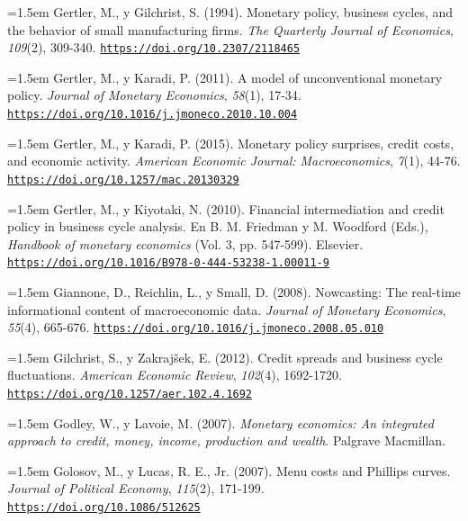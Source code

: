 \documentclass[10pt,a4paper]{article}
\begin{document}
\noindent\hangindent=1.5em Gertler, M., y Gilchrist, S. (1994). Monetary policy, business cycles, and the behavior of small manufacturing firms. \textit{The Quarterly Journal of Economics}, \textit{109}(2), 309-340. \href{https://doi.org/10.2307/2118465}{\nolinkurl{https://doi.org/10.2307/2118465}}

\noindent\hangindent=1.5em Gertler, M., y Karadi, P. (2011). A model of unconventional monetary policy. \textit{Journal of Monetary Economics}, \textit{58}(1), 17-34. \href{https://doi.org/10.1016/j.jmoneco.2010.10.004}{\nolinkurl{https://doi.org/10.1016/j.jmoneco.2010.10.004}}

\noindent\hangindent=1.5em Gertler, M., y Karadi, P. (2015). Monetary policy surprises, credit costs, and economic activity. \textit{American Economic Journal: Macroeconomics}, \textit{7}(1), 44-76. \href{https://doi.org/10.1257/mac.20130329}{\nolinkurl{https://doi.org/10.1257/mac.20130329}}

{\sloppy\noindent\hangindent=1.5em Gertler, M., y Kiyotaki, N. (2010). Financial intermediation and credit policy in business cycle analysis. En B. M. Friedman y M. Woodford (Eds.), \textit{Handbook of monetary economics} (Vol. 3, pp. 547-599). Elsevier. \href{https://doi.org/10.1016/B978-0-444-53238-1.00011-9}{\nolinkurl{https://doi.org/10.1016/B978-0-444-53238-1.00011-9}}\par}

\noindent\hangindent=1.5em Giannone, D., Reichlin, L., y Small, D. (2008). Nowcasting: The real-time informational content of macroeconomic data. \textit{Journal of Monetary Economics}, \textit{55}(4), 665-676. \href{https://doi.org/10.1016/j.jmoneco.2008.05.010}{\nolinkurl{https://doi.org/10.1016/j.jmoneco.2008.05.010}}

\noindent\hangindent=1.5em Gilchrist, S., y Zakrajšek, E. (2012). Credit spreads and business cycle fluctuations. \textit{American Economic Review}, \textit{102}(4), 1692-1720. \href{https://doi.org/10.1257/aer.102.4.1692}{\nolinkurl{https://doi.org/10.1257/aer.102.4.1692}}

\noindent\hangindent=1.5em Godley, W., y Lavoie, M. (2007). \textit{Monetary economics: An integrated approach to credit, money, income, production and wealth}. Palgrave Macmillan.

\noindent\hangindent=1.5em Golosov, M., y Lucas, R. E., Jr. (2007). Menu costs and Phillips curves. \textit{Journal of Political Economy}, \textit{115}(2), 171-199. \href{https://doi.org/10.1086/512625}{\nolinkurl{https://doi.org/10.1086/512625}}
\end{document}
